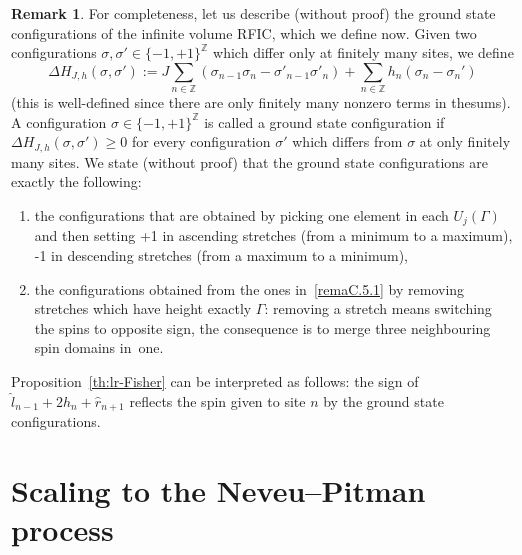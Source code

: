 \documentclass[10pt]{amsart}
\theoremstyle{definition}\newtheorem{defi}[theo]{Definition}\newtheorem{rema}[theo]{Remark}\newtheorem{exam}[theo]{Example}\newtheorem{exem}[theo]{Example}\newtheorem{nota}[theo]{Notation}
\newcommand{\Z}{\mathbb{Z}}
\newcommand{\gG}{\Gamma}
\newcommand{\ls}{\widehat{l}}
\newcommand{\rs}{\widehat{r}}
\begin{document}
\begin{rema}\label{rem-descrground}
For completeness, let us describe (without proof) the ground state configurations of the infinite volume RFIC, which we define now. Given two configurations $\sigma, \sigma'\in \{-1, +1 \}^\Z$ which differ only at finitely many sites, we define
\[
\Delta H_{J, h} (\sigma, \sigma'):= J\sum_{n\in \Z} \left(\sigma_{n-1} \sigma_n - \sigma'_{n-1} \sigma'_n \right) + \sum_{n\in \Z} h_n \left(\sigma_n -\sigma_n'\right)
\]
(this is well-defined since there are only finitely many nonzero terms in the\linebreak sums). A configuration {$\sigma \in  \{-1, +1\}^\Z$} is called a ground state configuration if $\Delta H_{J, h} (\sigma, \sigma') \ge 0$ for every configuration $\sigma'$ which differs from $\sigma$ at only finitely many sites. We state (without proof) that the ground state configurations are exactly the following:
\begin{enumerate}
\item\label{remaC.5.1} the configurations that are obtained by picking one element in each $U_j(\gG)$ and then setting +1 in ascending stretches (from a minimum to a maximum), -1 in descending stretches (from a maximum to a minimum),
\item\label{remaC.5.2} the configurations obtained from the ones in~\eqref{remaC.5.1} by removing stretches which have height exactly $\gG$: removing a stretch means switching the spins to opposite sign, the consequence is to merge three neighbouring spin domains in~one.
\end{enumerate}
Proposition~\ref{th:lr-Fisher} can be interpreted as follows: the sign of $\ls_{ n-1}+2 h_n + \rs_{n+1}$ reflects the spin given to site $n$ by the ground state configurations.
\end{rema}



\section{Scaling to the Neveu--Pitman process}\label{sec:scaling}
\end{document}
